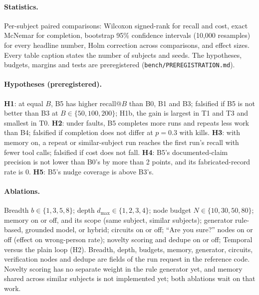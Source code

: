 \paragraph{Statistics.} Per-subject paired comparisons: Wilcoxon signed-rank for recall and cost, exact McNemar for completion, bootstrap 95\% confidence intervals (10{,}000 resamples) for every headline number, Holm correction across comparisons, and effect sizes. Every table caption states the number of subjects and seeds. The hypotheses, budgets, margins and tests are preregistered (\texttt{bench/PREREGISTRATION.md}).

\paragraph{Hypotheses (preregistered).} \textbf{H1}: at equal $B$, B5 has higher recall@$B$ than B0, B1 and B3; falsified if B5 is not better than B3 at $B\in\{50,100,200\}$; H1b, the gain is largest in T1 and T3 and smallest in T0. \textbf{H2}: under faults, B5 completes more runs and repeats less work than B4; falsified if completion does not differ at $p=0.3$ with kills. \textbf{H3}: with memory on, a repeat or similar-subject run reaches the first run's recall with fewer tool calls; falsified if cost does not fall. \textbf{H4}: B5's documented-claim precision is not lower than B0's by more than 2 points, and its fabricated-record rate is 0. \textbf{H5}: B5's nudge coverage is above B3's.

\paragraph{Ablations.} Breadth $b\in\{1,3,5,8\}$; depth $d_{\max}\in\{1,2,3,4\}$; node budget $N\in\{10,30,50,80\}$; memory on or off, and its scope (same subject, similar subjects); generator rule-based, grounded model, or hybrid; circuits on or off; ``Are you sure?'' nodes on or off (effect on wrong-person rate); novelty scoring and dedupe on or off; Temporal versus the plain loop (H2). Breadth, depth, budgets, memory, generator, circuits, verification nodes and dedupe are fields of the run request in the reference code. Novelty scoring has no separate weight in the rule generator yet, and memory shared across similar subjects is not implemented yet; both ablations wait on that work.
